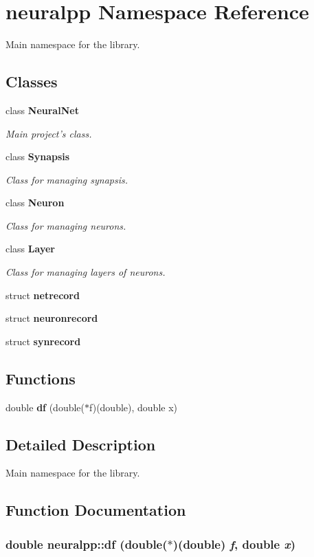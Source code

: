 \section{neuralpp Namespace Reference}
\label{namespaceneuralpp}
Main namespace for the library.  


\subsection*{Classes}
\begin{CompactItemize}
\item 
class {\bf NeuralNet}
\begin{CompactList}\small\item\em Main project's class. \item\end{CompactList}\item 
class {\bf Synapsis}
\begin{CompactList}\small\item\em Class for managing synapsis. \item\end{CompactList}\item 
class {\bf Neuron}
\begin{CompactList}\small\item\em Class for managing neurons. \item\end{CompactList}\item 
class {\bf Layer}
\begin{CompactList}\small\item\em Class for managing layers of neurons. \item\end{CompactList}\item 
struct {\bf netrecord}
\item 
struct {\bf neuronrecord}
\item 
struct {\bf synrecord}
\end{CompactItemize}
\subsection*{Functions}
\begin{CompactItemize}
\item 
double {\bf df} (double($\ast$f)(double), double x)
\end{CompactItemize}


\subsection{Detailed Description}
Main namespace for the library. 

\subsection{Function Documentation}
\subsubsection[df]{\setlength{\rightskip}{0pt plus 5cm}double neuralpp::df (double($\ast$)(double) {\em f}, \/  double {\em x})}\label{namespaceneuralpp_43c8197cc83f65fa9676386579671aec}



